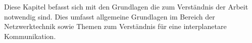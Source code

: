 \label{cap:grundlagen}
Diese Kapitel befasst sich mit den Grundlagen die zum Verst{\"a}ndnis der Arbeit
notwendig sind. Dies umfasst allgemeine Grundlagen im Bereich der
Netzwerktechnik sowie Themen zum Verständnis f{\"u}r eine interplanetare
Kommunikation.
